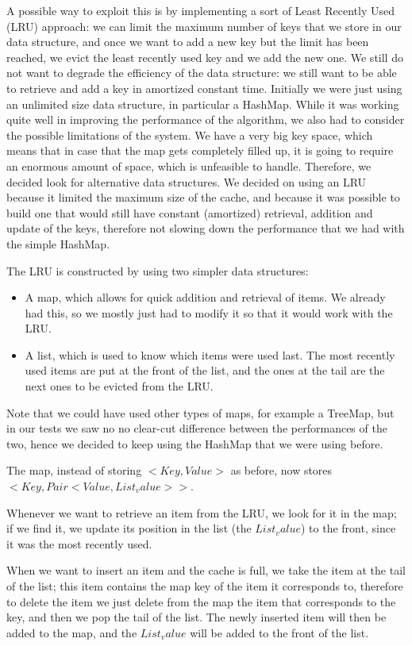 A possible way to exploit this is by implementing a sort of Least Recently Used (LRU) approach: we can limit the maximum number of keys that we store in our data structure, and once we want to add a new key but the limit has been reached, we evict the least recently used key and we add the new one. We still do not want to degrade the efficiency of the data structure: we still want to be able to retrieve and add a key in amortized constant time. Initially we were just using an unlimited size data structure, in particular a HashMap. While it was working quite well in improving the performance of the algorithm, we also had to consider the possible limitations of the system. We have a very big key space, which means that in case that the map gets completely filled up, it is going to require an enormous amount of space, which is unfeasible to handle. Therefore, we decided look for alternative data structures. We decided on using an LRU because it limited the maximum size of the cache, and because it was possible to build one that would still have constant (amortized) retrieval, addition and update of the keys, therefore not slowing down the performance that we had with the simple HashMap.

The LRU is constructed by using two simpler data structures:
\begin{itemize}  
  \item A map, which allows for quick addition and retrieval of items. We already had this, so we mostly just had to modify it so that it would work with the LRU.
  \item A list, which is used to know which items were used last. The most recently used items are put at the front of the list, and the ones at the tail are the next ones to be evicted from the LRU.
\end{itemize}

Note that we could have used other types of maps, for example a TreeMap, but in our tests we saw no no clear-cut difference between the performances of the two, hence we decided to keep using the HashMap that we were using before.

The map, instead of storing $<Key, Value>$ as before, now stores $<Key, Pair<Value, List_value>>$.

Whenever we want to retrieve an item from the LRU, we look for it in the map; if we find it, we update its position in the list (the $List_value$) to the front, since it was the most recently used.

When we want to insert an item and the cache is full, we take the item at the tail of the list; this item contains the map key of the item it corresponds to, therefore to delete the item we just delete from the map the item that corresponds to the key, and then we pop the tail of the list. 
The newly inserted item will then be added to the map, and the $List_value$ will be added to the front of the list.


